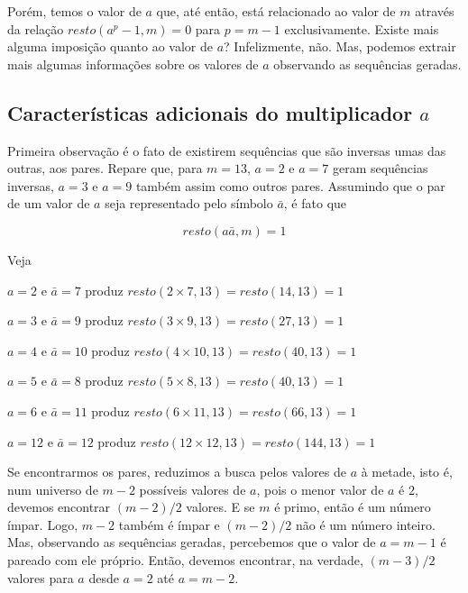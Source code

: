 \documentclass[a4paper,12pt,oneside,onecolumn]{uerj}
\begin{document}
Porém, temos o valor de $a$ que, até então, está relacionado ao valor de $m$ através da relação $resto(a^{p}-1,m)=0$ para $p=m-1$ exclusivamente. Existe mais alguma imposição quanto ao valor de $a$? Infelizmente, não. Mas, podemos extrair mais algumas informações sobre os valores de $a$ observando as sequências geradas.

\subsection{Características adicionais do multiplicador $a$}

Primeira observação é o fato de existirem sequências que são inversas umas das outras, aos pares. Repare que, para $m=13$, $a=2$ e $a=7$ geram sequências inversas, $a=3$ e $a=9$ também assim como outros pares. Assumindo que o par de um valor de $a$ seja representado pelo símbolo $\bar a$, é fato que

\begin{equation}
resto(a\bar a,m)=1
\end{equation}

Veja

\begin{lcircp}
    \item $a = 2$ e $\bar a = 7$ produz $resto(2\times 7,13)=resto(14,13)=1$
    \item $a = 3$ e $\bar a = 9$ produz $resto(3\times 9,13)=resto(27,13)=1$
    \item $a = 4$ e $\bar a = 10$ produz $resto(4\times 10,13)=resto(40,13)=1$
    \item $a = 5$ e $\bar a = 8$ produz $resto(5\times 8,13)=resto(40,13)=1$
    \item $a = 6$ e $\bar a = 11$ produz $resto(6\times 11,13)=resto(66,13)=1$
    \item $a = 12$ e $\bar a = 12$ produz $resto(12\times 12,13)=resto(144,13)=1$\\
\end{lcircp}

\noindent Se encontrarmos os pares, reduzimos a busca pelos valores de $a$ à metade, isto é, num universo de $m-2$ possíveis valores de $a$, pois o menor valor de $a$ é $2$, devemos encontrar $(m-2)/2$ valores. E se $m$ é primo, então é um número ímpar. Logo, $m-2$ também é ímpar e $(m-2)/2$ não é um número inteiro. Mas, observando as sequências geradas, percebemos que o valor de $a=m-1$ é pareado com ele próprio. Então, devemos encontrar, na verdade, $(m-3)/2$ valores para $a$ desde $a=2$ até $a=m-2$.
\end{document}
